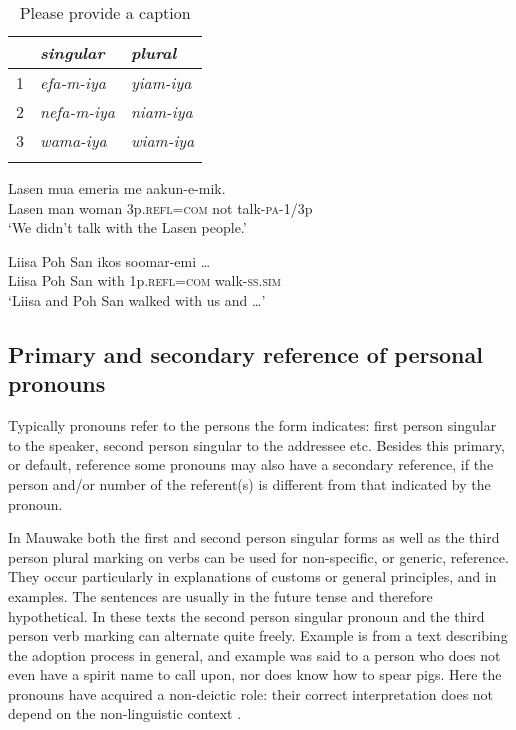 \begin{table}
\caption{Please provide a caption}
 
\begin{tabular}{l>{\itshape}l>{\itshape}l}
\mytoprule
 &\upshape singular &\upshape plural\\
\midrule
1 &efa-m-iya &yiam-iya\\
2 &nefa-m-iya &niam-iya\\
3 &wama-iya &wiam-iya\\
\mybottomrule
\end{tabular}
\end{table}


\ea%
\label{ex:3:x619}
\gll Lasen mua emeria  me aakun-e-mik. \\
Lasen man woman 3p.\textsc{refl}=\textsc{com} not talk-\textsc{pa}-1/3p\\
\glt`We didn't talk with the Lasen people.'
\z

\ea%
\label{ex:3:x620}
\gll Liisa Poh San ikos  soomar-emi {\dots} \\
Liisa Poh San with 1p.\textsc{refl}=\textsc{com} walk-\textsc{ss}.\textsc{sim}\\
\glt`Liisa and Poh San walked with us and {\dots}'
\z

\subsection{Primary and secondary reference of personal pronouns}
{}
Typically pronouns refer to the persons the form indicates: first person singular to the speaker, second person singular to the addressee etc. Besides this primary, or default, reference some pronouns may also have a secondary reference, if the person and/or number of the referent(s) is different from that indicated by the pronoun.

In Mauwake both the first and second person singular forms as well as the third person plural marking on verbs can be used for non-specific, or generic, reference. They occur particularly in explanations of customs or general principles, and in examples. The sentences are usually in the future tense and therefore hypothetical. In these texts the second person singular pronoun and the third person verb marking can alternate quite freely. Example  is from a text describing the adoption process in general, and example  was said to a person who does not even have a spirit name to call upon, nor does know how to spear pigs. Here the pronouns have acquired a non-deictic role: their correct interpretation does not depend on the non-linguistic context \citep[260]{AndersonEtAl1985}%
.

